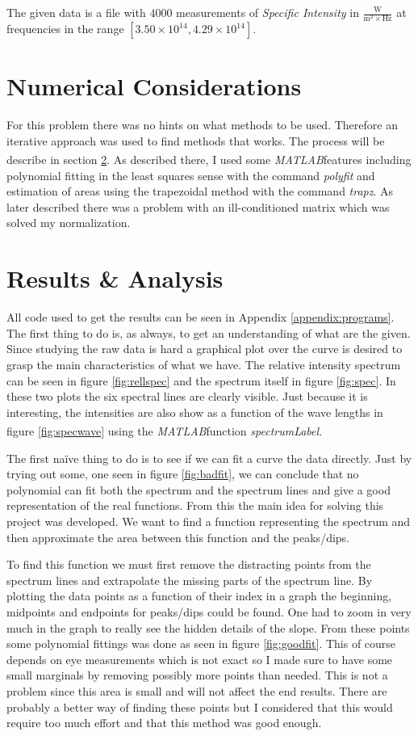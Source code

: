 \documentclass[10pt, a4paper]{article}
\newcommand{\matlab}{\small{\emph{MATLAB\textsuperscript{\textregistered}}}}
\begin{document}
The given data is a file with $4000$ measurements of \emph{Specific Intensity} in $\frac{\mathrm{W}}{\mathrm{m}^2\times \mathrm{Hz}}$ at frequencies in the range $[3.50\times10^{14}, 4.29\times10^{14}]$.

\section{Numerical Considerations}
For this problem there was no hints on what methods to be used. Therefore an iterative approach was used to find methods that works. The process will be describe in section \ref{sec:result}. As described there, I used some \matlab features including polynomial fitting in the least squares sense with the command \emph{polyfit} and estimation of areas using the trapezoidal method with the command \emph{trapz}. As later described there was a problem with an ill-conditioned matrix which was solved my normalization.

\section{Results \& Analysis} \label{sec:result}
All code used to get the results can be seen in Appendix \ref{appendix:programs}. The first thing to do is, as always, to get an understanding of what are the given. Since studying the raw data is hard a graphical plot over the curve is desired to grasp the main characteristics of what we have. The relative intensity spectrum can be seen in figure \ref{fig:rellspec} and the spectrum itself in figure \ref{fig:spec}. In these two plots the six spectral lines are clearly visible. Just because it is interesting, the intensities are also show as a function of the wave lengths in figure \ref{fig:specwave} using the \matlab function \emph{spectrumLabel}\cite{spectrumLabel}.

The first na\"{i}ve thing to do is to see if we can fit a curve the data directly. Just by trying out some, one seen in figure \ref{fig:badfit}, we can conclude that no polynomial can fit both the spectrum and the spectrum lines and give a good representation of the real functions. From this the main idea for solving this project was developed. We want to find a function representing the spectrum and then approximate the area between this function and the peaks/dips.

To find this function we must first remove the distracting points from the spectrum lines and extrapolate the missing parts of the spectrum line. By plotting the data points as a function of their index in a graph the beginning, midpoints and endpoints for peaks/dips could be found. One had to zoom in very much in the graph to really see the hidden details of the slope. From these points some polynomial fittings was done as seen in figure \ref{fig:goodfit}. This of course depends on eye measurements which is not exact so I made sure to have some small marginals by removing possibly more points than needed. This is not a problem since this area is small and will not affect the end results. There are probably a better way of finding these points but I considered that this would require too much effort and that this method was good enough.
\end{document}
